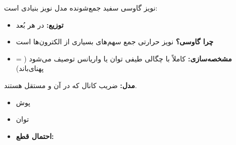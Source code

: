 
نویز گاوسی سفید جمع‌شونده  مدل نویز بنیادی است:

\begin{itemize}
\tightlist
\item
  \textbf{توزیع:}  در هر بُعد
\item
  \textbf{چرا گاوسی؟}   نویز حرارتی جمع سهم‌های بسیاری از الکترون‌ها است
\item
  \textbf{مشخصه‌سازی:} کاملاً با چگالی طیفی توان  یا واریانس  توصیف می‌شود ( = پهنای‌باند)
\end{itemize}


\textbf{مدل:} ضریب کانال  که در آن  و مستقل هستند.

\begin{itemize}
\tightlist
\item
  پوش 
\item
  توان 
\item
  \textbf{احتمال قطع:} 
\end{itemize}


